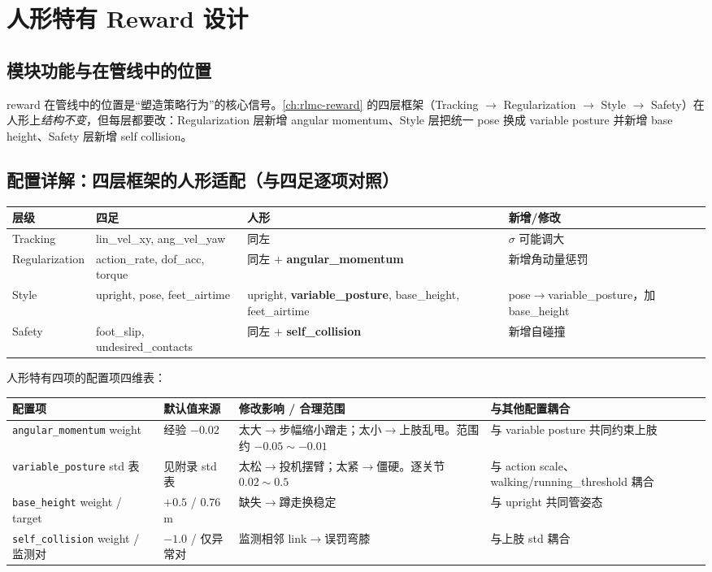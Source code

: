 \section{人形特有 Reward 设计}\label{sec:rlmc-hl-reward}

\subsection{模块功能与在管线中的位置}
reward 在管线中的位置是“塑造策略行为”的核心信号。\cref{ch:rlmc-reward} 的四层框架（Tracking $\to$ Regularization $\to$ Style $\to$ Safety）在人形上\emph{结构不变}，但每层都要改：Regularization 层新增 angular momentum、Style 层把统一 pose 换成 variable posture 并新增 base height、Safety 层新增 self collision。

\subsection{配置详解：四层框架的人形适配（与四足逐项对照）}

\begin{center}
\small
\begin{tabular}{p{1.8cm}p{3.2cm}p{3.6cm}p{3.0cm}}
\hline
层级 & 四足 & 人形 & 新增/修改 \\
\hline
Tracking & lin\_vel\_xy, ang\_vel\_yaw & 同左 & $\sigma$ 可能调大 \\
Regularization & action\_rate, dof\_acc, torque & 同左 $+$ \textbf{angular\_momentum} & 新增角动量惩罚 \\
Style & upright, pose, feet\_airtime & upright, \textbf{variable\_posture}, base\_height, feet\_airtime & pose$\to$variable\_posture，加 base\_height \\
Safety & foot\_slip, undesired\_contacts & 同左 $+$ \textbf{self\_collision} & 新增自碰撞 \\
\hline
\end{tabular}
\end{center}

人形特有四项的配置项四维表：

\begin{center}
\small
\begin{tabular}{p{2.4cm}p{2.4cm}p{3.4cm}p{3.4cm}}
\hline
配置项 & 默认值来源 & 修改影响 / 合理范围 & 与其他配置耦合 \\
\hline
\texttt{angular\_momentum} weight & 经验 $-0.02$ & 太大$\to$步幅缩小蹭走；太小$\to$上肢乱甩。范围约 $-0.05\sim-0.01$ & 与 variable posture 共同约束上肢 \\
\texttt{variable\_posture} std 表 & 见附录 std 表 & 太松$\to$投机摆臂；太紧$\to$僵硬。逐关节 $0.02\sim0.5$ & 与 action scale、walking/running\_threshold 耦合 \\
\texttt{base\_height} weight / target & $+0.5$ / $0.76$\,m & 缺失$\to$蹲走换稳定 & 与 upright 共同管姿态 \\
\texttt{self\_collision} weight / 监测对 & $-1.0$ / 仅异常对 & 监测相邻 link$\to$误罚弯膝 & 与上肢 std 耦合 \\
\hline
\end{tabular}
\end{center}


